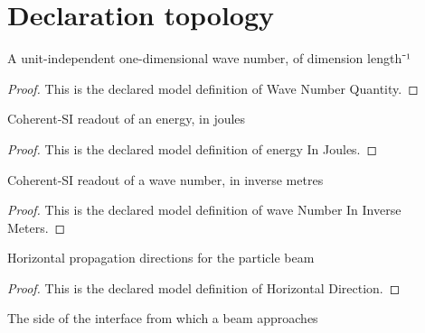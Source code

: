 \section{Declaration topology}
\begin{definition}
  \label{def:physics:phyx-mini-0544:phyxminiproblems-problemphyxmini0544-wavenumberquantity}
  A unit-independent one-dimensional wave number, of dimension length⁻¹
\end{definition}
\begin{proof}
  This is the declared model definition of Wave Number Quantity.
\end{proof}
\begin{definition}
  \label{def:physics:phyx-mini-0544:phyxminiproblems-problemphyxmini0544-energyinjoules}
  Coherent-SI readout of an energy, in joules
\end{definition}
\begin{proof}
  This is the declared model definition of energy In Joules.
\end{proof}
\begin{definition}
  \label{def:physics:phyx-mini-0544:phyxminiproblems-problemphyxmini0544-wavenumberininversemeters}
  Coherent-SI readout of a wave number, in inverse metres
\end{definition}
\begin{proof}
  This is the declared model definition of wave Number In Inverse Meters.
\end{proof}
\begin{definition}
  \label{def:physics:phyx-mini-0544:phyxminiproblems-problemphyxmini0544-horizontaldirection}
  Horizontal propagation directions for the particle beam
\end{definition}
\begin{proof}
  This is the declared model definition of Horizontal Direction.
\end{proof}
\begin{definition}
  \label{def:physics:phyx-mini-0544:phyxminiproblems-problemphyxmini0544-interfaceside}
  The side of the interface from which a beam approaches
\end{definition}
